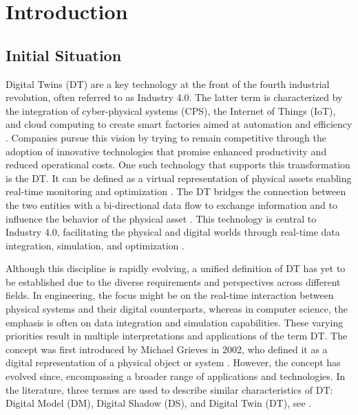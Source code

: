 \chapter{Introduction}
\label{chap:introduction}

\section{Initial Situation}
Digital Twins (DT) are a key technology at the front of the fourth industrial revolution, often referred to as Industry 4.0.
The latter term is characterized by the integration of cyber-physical systems (CPS), the Internet of Things (IoT), and cloud computing to create smart factories aimed at automation and efficiency \parencite{Oztemel2020}. Companies pursue this vision by trying to remain competitive through the adoption of innovative technologies that promise enhanced productivity and reduced operational costs. One such technology that supports this transformation is the DT. It can be defined as a virtual representation of physical assets enabling real-time monitoring and optimization \parencite{Tao2018ijamt}. The DT bridges the connection between the two entities with a bi-directional data flow to exchange information and to influence the behavior of the physical asset \parencite{grieves2014digital}. This technology is central to Industry 4.0, facilitating the physical and digital worlds through real-time data integration, simulation, and optimization \parencite{judijanto2024trends}.

Although this discipline is rapidly evolving, a unified definition of DT has yet to be established due to the diverse requirements and perspectives across different fields. In engineering, the focus might be on the real-time interaction between physical systems and their digital counterparts, whereas in computer science, the emphasis is often on data integration and simulation capabilities. These varying priorities result in multiple interpretations and applications of the term DT. The concept was first introduced by Michael Grieves in 2002, who defined it as a digital representation of a physical object or system \parencite{grieves2014digital}. However, the concept has evolved since, encompassing a broader range of applications and technologies. In the literature, three termes are used to describe similar characteristics of DT: Digital Model (DM), Digital Shadow (DS), and Digital Twin (DT), see  \parencite{jones2020characterising,Zhang2021jmsy}.


